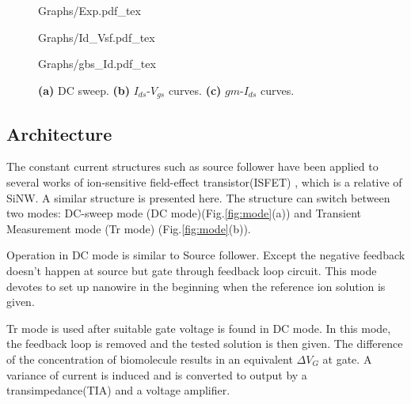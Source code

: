 \documentclass{article}
\begin{document}
\begin{figure}[!bht]
    \begin{minipage}[!htb]{0.4\linewidth}
        \centering
        \def\svgwidth{3cm}
        \fontsize{6}{15}\selectfont
         {Graphs/Exp.pdf_tex}
        \fontsize{10}{10}\selectfont
    \end{minipage}
    \begin{minipage}[!htb]{0.6\linewidth}
        \begin{minipage}[!htb]{0.97\linewidth}
            \centering
            \def\svgwidth{4.3cm}
            \fontsize{6}{15}\selectfont
             {Graphs/Id_Vsf.pdf_tex}
        \end{minipage}
        \vfill
        \begin{minipage}[!htb]{1\linewidth}
            \centering
            \def\svgwidth{3.8cm}
            \fontsize{6}{15}\selectfont
             {Graphs/gbs_Id.pdf_tex}
        \end{minipage}
    \end{minipage}
    \caption{\textbf{(a)} DC sweep. \textbf{(b)} $I_{ds}$-$V_{gs}$ curves. \textbf{(c)} $gm$-$I_{ds}$ curves.}
    \label{fig:idvg}
\end{figure}




\subsection{Architecture}
The constant current structures such as source follower have been applied to several works of ion-sensitive field-effect transistor(ISFET) \cite{J6}, which is a relative of SiNW.
A similar structure is presented here.
The structure can switch between two modes: DC-sweep mode (DC mode)(Fig.\ref{fig:mode}(a)) and Transient Measurement mode (Tr mode) (Fig.\ref{fig:mode}(b)).

Operation in DC mode is similar to Source follower.
Except the negative feedback doesn’t happen at source but gate through feedback loop circuit.
This mode devotes to set up nanowire in the beginning when the reference ion solution is given.

Tr mode is used after suitable gate voltage is found in DC mode.
In this mode, the feedback loop is removed and the tested solution is then given.
The difference of the concentration of biomolecule results in an equivalent $\Delta V_G$ at gate.
A variance of current is induced and is converted to output by a transimpedance(TIA) and a voltage amplifier.
\end{document}
